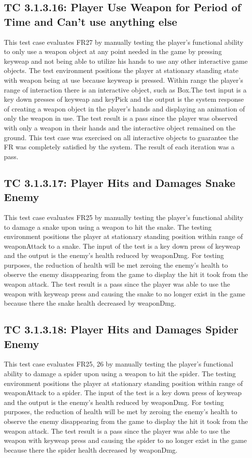 \documentclass[12pt, titlepage]{article}
\begin{document}
\subsection*{TC 3.1.3.16: Player Use Weapon for Period of Time and Can't use anything else}
This test case evaluates FR27 by manually testing the player's functional ability to only use a weapon object at any point needed in the game by pressing keyweap and not being able to utilize his hands to use any other interactive game objects. The test environment positions the player at stationary standing state with weapon being at use because keyweap is pressed. Within range the player's range of interaction there is an interactive object, such as Box.The test input is a key down presses of keyweap and keyPick and the output is the system response of creating a weapon object in the player's hands and displaying an animation of only the weapon in use. The test result is a pass since the player was observed with only a weapon in their hands and the interactive object remained on the ground. This test case was exercised on all interactive objects to guarantee the FR was completely satisfied by the system. The result of each iteration was a pass. 

\subsection*{TC 3.1.3.17: Player Hits and Damages Snake Enemy}
This test case evaluates FR25 by manually testing the player's functional ability to damage a snake upon using a weapon to hit the snake. The testing environment positions the player at stationary standing position within range of weaponAttack to a snake. The input of the test is a key down press of keyweap and the output is the enemy's health reduced by weaponDmg. For testing purposes, the reduction of health will be met zeroing the enemy's health to observe the enemy disappearing from the game to display the hit it took from the weapon attack. The test result is a pass since the player was able to use the weapon with keyweap press and causing the snake to no longer exist in the game because there the snake health decreased by weaponDmg. 

\subsection*{TC 3.1.3.18: Player Hits and Damages Spider Enemy}
This test case evaluates FR25, 26 by manually testing the player's functional ability to damage a spider upon using a weapon to hit the spider. The testing environment positions the player at stationary standing position within range of weaponAttack to a spider. The input of the test is a key down press of keyweap and the output is the enemy's health reduced by weaponDmg. For testing purposes, the reduction of health will be met by zeroing the enemy's health to observe the enemy disappearing from the game to display the hit it took from the weapon attack. The test result is a pass since the player was able to use the weapon with keyweap press and causing the spider to no longer exist in the game because there the spider health decreased by weaponDmg. 
\end{document}
